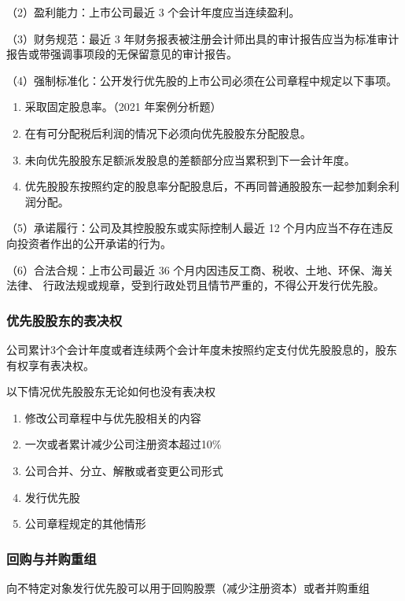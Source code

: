 \documentclass[UTF8,12pt]{ctexart}
\numberwithin{equation}{section} %
\numberwithin{figure}{section}
\numberwithin{table}{section}
\begin{document}
	（2）盈利能力：上市公司最近 3 个会计年度应当连续盈利。
	
	（3）财务规范：最近 3 年财务报表被注册会计师出具的审计报告应当为标准审计报告或带强调事项段的无保留意见的审计报告。
	
	（4）强制标准化：公开发行优先股的上市公司必须在公司章程中规定以下事项。
	\begin{enumerate}
		\item 采取固定股息率。（2021 年案例分析题）
		
		\item 在有可分配税后利润的情况下必须向优先股股东分配股息。
		
		\item 未向优先股股东足额派发股息的差额部分应当累积到下一会计年度。
		
		\item 优先股股东按照约定的股息率分配股息后，不再同普通股股东一起参加剩余利润分配。
	\end{enumerate}
	（5）承诺履行：公司及其控股股东或实际控制人最近 12 个月内应当不存在违反向投资者作出的公开承诺的行为。
	
	（6）合法合规：上市公司最近 36 个月内因违反工商、税收、土地、环保、海关法律、
	行政法规或规章，受到行政处罚且情节严重的，不得公开发行优先股。
	
	\subsubsection{优先股股东的表决权}
	公司累计3个会计年度或者连续两个会计年度未按照约定支付优先股股息的，股东有权享有表决权。
	
	以下情况优先股股东无论如何也没有表决权
	\begin{enumerate}
		\item 修改公司章程中与优先股相关的内容
		
		\item 一次或者累计减少公司注册资本超过10\%
		
		\item 公司合并、分立、解散或者变更公司形式
		
		\item 发行优先股
		
		\item 公司章程规定的其他情形
	\end{enumerate}
	
	\subsubsection{回购与并购重组}
	向不特定对象发行优先股可以用于回购股票（减少注册资本）或者并购重组
	
\end{document}

